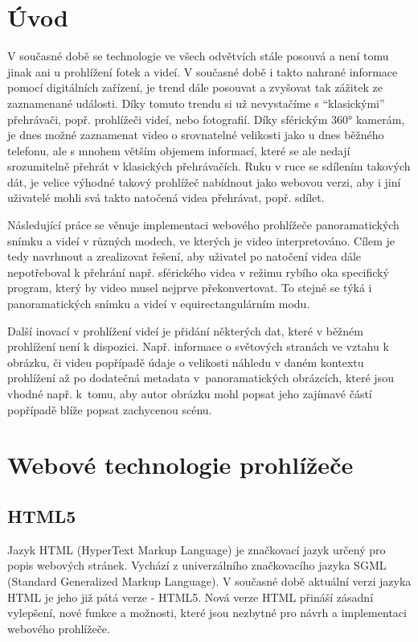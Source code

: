 
\chapter{Úvod}

V současné době se technologie ve všech odvětvích stále posouvá a není tomu jinak ani u prohlížení fotek a videí. V současné době i takto nahrané informace pomocí digitálních zařízení, je trend dále posouvat a zvyšovat tak zážitek ze zaznamenané události. Díky tomuto trendu si už nevystačíme s ``klasickými''  přehrávači, popř. prohlížeči videí, nebo fotografií. Díky sférickým 360° kamerám, je dnes možné zaznamenat video o srovnatelné velikosti jako u dnes běžného telefonu, ale s mnohem větším objemem informací, které se ale nedají srozumitelně přehrát v klasických přehrávačích. Ruku v ruce se sdílením takových dát, je velice výhodné takový prohlížeč nabídnout jako webovou verzi, aby i jiní uživatelé mohli svá takto natočená videa přehrávat, popř. sdílet.

Následující práce se věnuje implementaci webového prohlížeče panoramatických snímku a videí v různých modech, ve kterých je video interpretováno. Cílem je tedy navrhnout a zrealizovat řešení, aby uživatel po natočení videa dále nepotřeboval k přehrání např. sférického videa v režimu rybího oka specifický program, který by video musel nejprve překonvertovat. To stejné se týká i panoramatických snímku a videí v equirectangulárním modu.  

Další inovací v prohlížení videí je přidání některých dat, které v běžném prohlížení není k dispozici. Např. informace o světových stranách ve vztahu k obrázku, či videu popřípadě údaje o velikosti náhledu v daném kontextu prohlížení až po dodatečná metadata v~panoramatických obrázcích, které jsou vhodné např. k~tomu, aby autor obrázku mohl popsat jeho zajímavé částí popřípadě blíže popsat zachycenou scénu.


\chapter{Webové technologie prohlížeče}

\section{HTML5}

Jazyk HTML (HyperText Markup Language) je značkovací jazyk určený pro popis webových stránek. Vychází z univerzálního značkovacího jazyka SGML (Standard Generalized Markup Language). V současné době aktuální verzi  jazyka HTML je jeho již pátá verze -  HTML5. Nová verze HTML přináší zásadní vylepšení, nové funkce a možnosti, které jsou nezbytné pro návrh a implementaci webového prohlížeče. 

